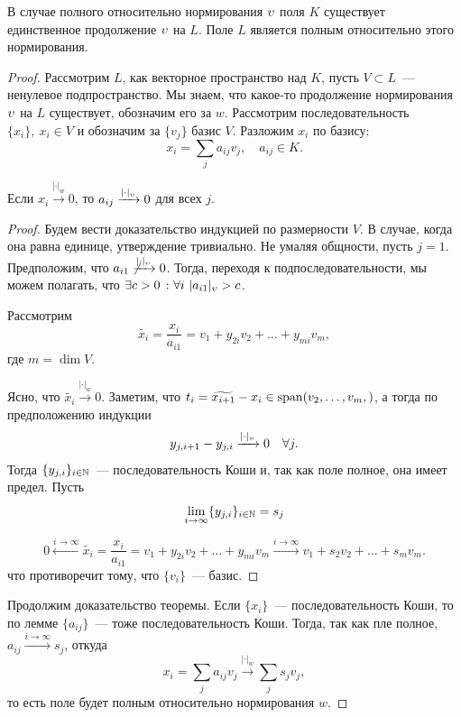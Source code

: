  	\begin{theorem} 
 		В случае полного относительно нормирования $\upsilon$ поля $K$ существует единственное продолжение $\upsilon$ на $L$. Поле $L$ является полным относительно этого нормирования. 
 	\end{theorem}
 	\begin{proof}

 	Рассмотрим $L$, как векторное пространство над $K$, пусть $V \subset L$~--- ненулевое подпространство. Мы знаем, что какое-то продолжение нормирования $\upsilon$ на $L$ существует, обозначим его за $w$. Рассмотрим последовательность  $\{ x_i \}, \ x_i \in V$ и обозначим за $\{ v_j \}$  базис $V$. Разложим $x_i$ по базису: 
 	\[
 		x_i = \sum_{j} a_{i j} v_{j}, \quad a_{i j} \in K.
 	\]

 	\begin{lemma} 
 		Если $x_i \xrightarrow{|\cdot|_{w}} 0$, то $a_{i j} \xrightarrow{|\cdot|_{\upsilon}} 0$ для всех $j$. 
 	\end{lemma}
 	\begin{proof}
 		Будем вести доказательство индукцией по размерности $V$. В случае, когда она равна единице, утверждение тривиально. Не умаляя общности, пусть $j = 1$. Предположим, что $a_{i 1} \not\xrightarrow{|\cdot|_{\upsilon}} 0$. Тогда, переходя к подпоследовательности, мы можем полагать, что $\exists c > 0 \ \colon \forall i \ |a_{i 1}|_{\upsilon} > c$.

 		Рассмотрим 
 		\[ 
 			\widetilde{x_i} = \frac{x_i}{a_{i 1}} = v_1 + y_{2i} v_2 + \ldots + y_{mi} v_m,  
 		\] 
 		где $m = \dim{V}$. 


 		Ясно, что $\widetilde{x_i} \xrightarrow{|\cdot|_{w}} 0$. Заметим, что $t_i = \widetilde{x_{i + 1}} - x_{i} \in \Span\lr*{v_2, \ldots, v_{m},}$, а тогда по предположению индукции 
 		\[ 
 			y_{j,i+ 1} - y_{j, i} \xrightarrow{|\cdot|_{\upsilon}} 0 \quad \forall j.
 		\]	
 		 Тогда $\{ y_{j, i} \}_{i \in \mathbb{N}}$~--- последовательность Коши и, так как поле полное, она имеет предел. Пусть 
 		\[
 			\lim_{i \to \infty} \{ y_{j, i} \}_{i \in \mathbb{N}} = s_{j}
 		\]

 		\[
 			0 \xleftarrow{i \to \infty} \widetilde{x_i} = \frac{x_i}{a_{i 1}} = v_1 + y_{2i} v_2 + \ldots + y_{mi} v_m \xrightarrow{i \to \infty} v_1 + s_2 v_2 + \ldots + s_m v_m.
 		\]
 		что противоречит тому, что $\{ v_i \}$~--- базис. 

 	\end{proof}

 	Продолжим доказательство теоремы. Если $\{ x_i \}$~--- последовательность Коши, то по лемме $\{ a_{i j} \}$~--- тоже последовательность Коши. Тогда, так как пле полное, $a_{i j} \xrightarrow{i \to \infty} s_j$, откуда 
 	\[
 		x_i = \sum_{j} a_{i j} v_{j} \xrightarrow{|\cdot|_{w}} \sum_{j} s_j v_j,
 	\]
 	то есть поле будет полным относительно нормирования $w$. 


\end{proof}
